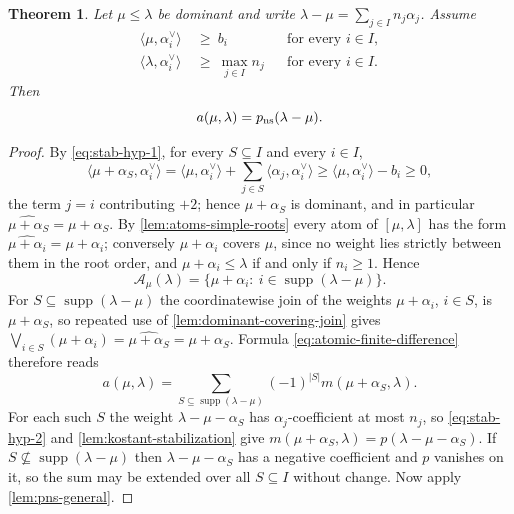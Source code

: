 \documentclass[11pt]{article}
\newtheorem{theorem}{Theorem}[section]
\theoremstyle{definition}
\theoremstyle{remark}
\newcommand{\supp}{\operatorname{supp}}
\begin{document}
\begin{theorem}\label{thm:atomic-stabilization}
Let $\mu\le\lambda$ be dominant and write
$\lambda-\mu=\sum_{j\in I}n_j\alpha_j$.  Assume
\begin{align}
  \langle\mu,\alpha_i^\vee\rangle&\ \ge\ b_i
     &&\text{for every }i\in I,\label{eq:stab-hyp-1}\\
  \langle\lambda,\alpha_i^\vee\rangle&\ \ge\ \max_{j\in I}n_j
     &&\text{for every }i\in I.\label{eq:stab-hyp-2}
\end{align}
Then
\begin{equation}\label{eq:atomic-stable-value}
   a(\mu,\lambda)=p_{\rm ns}(\lambda-\mu).
\end{equation}
\end{theorem}

\begin{proof}
By \eqref{eq:stab-hyp-1}, for every $S\subseteq I$ and every $i\in I$,
\[
   \langle\mu+\alpha_S,\alpha_i^\vee\rangle
     =\langle\mu,\alpha_i^\vee\rangle
       +\sum_{j\in S}\langle\alpha_j,\alpha_i^\vee\rangle
     \ge\langle\mu,\alpha_i^\vee\rangle-b_i\ge0,
\]
the term $j=i$ contributing $+2$; hence $\mu+\alpha_S$ is dominant, and in
particular $\widehat{\mu+\alpha_S}=\mu+\alpha_S$.  By
\cref{lem:atoms-simple-roots} every atom of $[\mu,\lambda]$ has the form
$\widehat{\mu+\alpha_i}=\mu+\alpha_i$; conversely $\mu+\alpha_i$ covers
$\mu$, since no weight lies strictly between them in the root order, and
$\mu+\alpha_i\le\lambda$ if and only if $n_i\ge1$.  Hence
\[
   \mathcal A_\mu(\lambda)=\{\mu+\alpha_i:\ i\in\supp(\lambda-\mu)\}.
\]
For $S\subseteq\supp(\lambda-\mu)$ the coordinatewise join of the weights
$\mu+\alpha_i$, $i\in S$, is $\mu+\alpha_S$, so repeated use of
\cref{lem:dominant-covering-join} gives
$\bigvee_{i\in S}(\mu+\alpha_i)=\widehat{\mu+\alpha_S}=\mu+\alpha_S$.
Formula \eqref{eq:atomic-finite-difference} therefore
reads
\[
   a(\mu,\lambda)
     =\sum_{S\subseteq\supp(\lambda-\mu)}(-1)^{|S|}
        m(\mu+\alpha_S,\lambda).
\]
For each such $S$ the weight $\lambda-\mu-\alpha_S$ has $\alpha_j$-coefficient
at most $n_j$, so \eqref{eq:stab-hyp-2} and
\cref{lem:kostant-stabilization} give
$m(\mu+\alpha_S,\lambda)=p(\lambda-\mu-\alpha_S)$.  If
$S\not\subseteq\supp(\lambda-\mu)$ then $\lambda-\mu-\alpha_S$ has a negative
coefficient and $p$ vanishes on it, so the sum may be extended over all
$S\subseteq I$ without change.  Now apply \cref{lem:pns-general}.
\end{proof}
\end{document}
